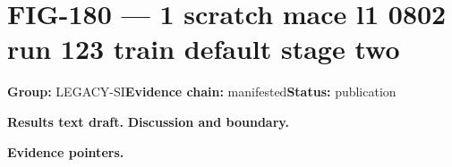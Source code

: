 \clearpage
\section{FIG-180 --- 1 scratch mace l1 0802 run 123 train default stage two}
\label{figpage:fig-180}
\textbf{Group:} LEGACY-SI\quad \textbf{Evidence chain:} manifested\quad \textbf{Status:} publication

\textbf{Results text draft.} 
\textbf{Discussion and boundary.} 


\textbf{Evidence pointers.}



\vfill
